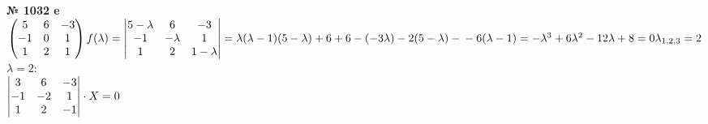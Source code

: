 \documentclass[12pt]{article}
\newenvironment{task}[1][0]{\vspace{.5cm} {\textbf{№ #1} \vspace{.5cm}\\ }}{\\}
\begin{document}
\begin{task}[1032 e]
	$
	\begin{pmatrix}
		5 & 6 & -3\\
		-1 & 0 & 1\\
		1 & 2 & 1\\
	\end{pmatrix}\\
	f(\lambda) = 
	\begin{vmatrix}
		5 - \lambda & 6 & -3\\
		-1 & -\lambda & 1\\
		1 & 2 & 1-\lambda\\
	\end{vmatrix} = \lambda(\lambda-1)(5-\lambda) + 6+6-(-3\lambda)-2(5-\lambda)-\\-6(\lambda-1)=
	-\lambda^3 +6\lambda^2-12\lambda+8=0\\
	\lambda_{1,2,3}=2\\
	$\\
	$\lambda = 2$:\\
	$
\begin{vmatrix}
	3 & 6 & -3\\
	-1 & -2 & 1\\
	1 & 2 & -1\\
\end{vmatrix} \cdot X = 0\\
$


\end{task}
\end{document}
